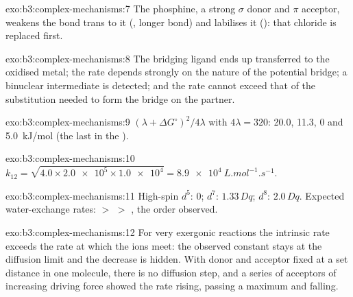 \begin{solution}{exo:b3:complex-mechanisms:7}
The phosphine, a strong $\sigma$ donor and $\pi$ acceptor, weakens the bond trans to it (, longer bond) and labilises it (): that chloride is
replaced first.
\end{solution}

\begin{solution}{exo:b3:complex-mechanisms:8}
The bridging ligand ends up transferred to the oxidised metal; the rate depends
strongly on the nature of the potential bridge; a binuclear intermediate is
detected; and the rate cannot exceed that of the substitution needed to form the
bridge on the  partner.
\end{solution}

\begin{solution}{exo:b3:complex-mechanisms:9}
$(\lambda + \Delta G^\circ)^2/4\lambda$ with $4\lambda = 320$: 20.0, 11.3, 0 and \qty{5.0}{kJ/mol} (the last in the ).
\end{solution}

\begin{solution}{exo:b3:complex-mechanisms:10}
$k_{12} = \sqrt{4.0 \times \num{2.0e5} \times \num{1.0e4}} = \qty{8.9e4}{L.mol^{-1}.s^{-1}}$.
\end{solution}

\begin{solution}{exo:b3:complex-mechanisms:11}
High-spin $d^5$: 0; $d^7$: $1.33\,Dq$; $d^8$: $2.0\,Dq$. Expected water-exchange rates:  $>$  $>$
, the order observed.
\end{solution}

\begin{solution}{exo:b3:complex-mechanisms:12}
For very exergonic reactions the intrinsic rate exceeds the rate at which the ions
meet: the observed constant stays at the diffusion limit and the decrease is
hidden. With donor and acceptor fixed at a set distance in one molecule, there
is no diffusion step, and a series of acceptors of increasing driving force
showed the rate rising, passing a maximum and falling.
\end{solution}

